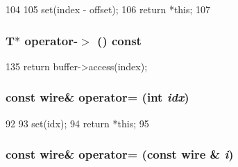\begin{DoxyCode}
104         {
105             set(index - offset);
106             return *this;
107         }
\end{DoxyCode}
\hypertarget{classTimeBuffer_1_1wire_ac0ddd007dfcfef3121f74d0665dfd0cd}{
\subsubsection[{operator-\/$>$}]{\setlength{\rightskip}{0pt plus 5cm}T$\ast$ operator-\/$>$ () const}}
\label{classTimeBuffer_1_1wire_ac0ddd007dfcfef3121f74d0665dfd0cd}



\begin{DoxyCode}
135 { return buffer->access(index); }
\end{DoxyCode}
\hypertarget{classTimeBuffer_1_1wire_af9026c4d5b1cde4a2f9a028412d58f16}{
\subsubsection[{operator=}]{\setlength{\rightskip}{0pt plus 5cm}const {\bf wire}\& operator= (int {\em idx})}}
\label{classTimeBuffer_1_1wire_af9026c4d5b1cde4a2f9a028412d58f16}



\begin{DoxyCode}
92         {
93             set(idx);
94             return *this;
95         }
\end{DoxyCode}
\hypertarget{classTimeBuffer_1_1wire_ac5762487c55cd8ca177c966d3e349f44}{
\subsubsection[{operator=}]{\setlength{\rightskip}{0pt plus 5cm}const {\bf wire}\& operator= (const {\bf wire} \& {\em i})}}
\label{classTimeBuffer_1_1wire_ac5762487c55cd8ca177c966d3e349f44}



